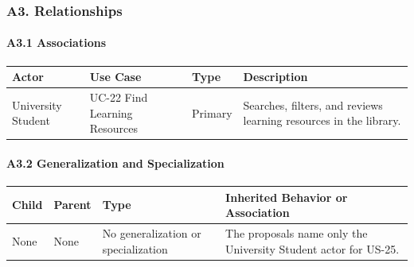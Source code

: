 \documentclass[12pt]{article}
\renewcommand{\baselinestretch}{1.5}
\begin{document}
\hypertarget{sec:a3-relationships}{}
\subsubsection*{A3. Relationships}
\par\medskip

\hypertarget{sec:a3-1-associations}{}
\paragraph*{A3.1 Associations}
\par\medskip

\begingroup
\small
\renewcommand{\baselinestretch}{1.0}\selectfont
\renewcommand{\arraystretch}{1.15}
\setlength{\tabcolsep}{6pt}
\begin{longtable}{|>{\raggedright\arraybackslash}p{}|>{\raggedright\arraybackslash}p{}|>{\raggedright\arraybackslash}p{}|>{\raggedright\arraybackslash}p{}|}
\hline
\textbf{Actor} & \textbf{Use Case} & \textbf{Type} & \textbf{Description} \\ \hline
\endhead
University Student & UC-22 Find Learning Resources & Primary & Searches, filters, and reviews learning resources in the library. \\ \hline
\end{longtable}
\endgroup
\par\medskip

\hypertarget{sec:a3-2-generalization-and-specialization}{}
\paragraph*{A3.2 Generalization and Specialization}
\par\medskip

\begingroup
\small
\renewcommand{\baselinestretch}{1.0}\selectfont
\renewcommand{\arraystretch}{1.15}
\setlength{\tabcolsep}{6pt}
\begin{longtable}{|>{\raggedright\arraybackslash}p{}|>{\raggedright\arraybackslash}p{}|>{\raggedright\arraybackslash}p{}|>{\raggedright\arraybackslash}p{}|}
\hline
\textbf{Child} & \textbf{Parent} & \textbf{Type} & \textbf{Inherited Behavior or Association} \\ \hline
\endhead
None & None & No generalization or specialization & The proposals name only the University Student actor for US-25. \\ \hline
\end{longtable}
\endgroup
\par\medskip
\end{document}
